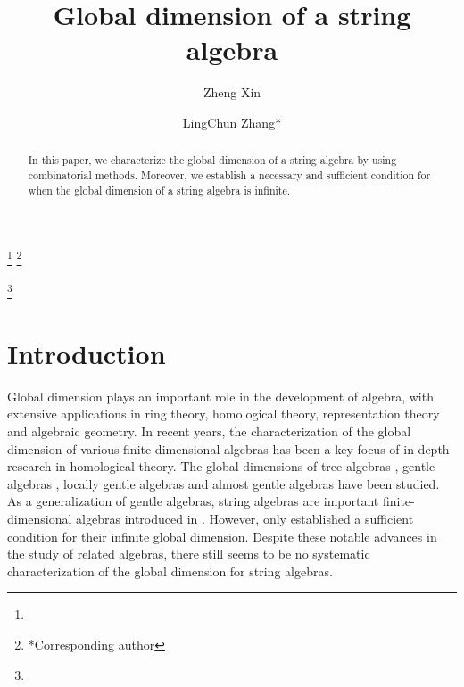 \documentclass[11pt]{amsart}
\numberwithin{equation}{section}
\theoremstyle{definition}
\begin{document}
\title[Global dimension of a string algebra ]{Global dimension of a string algebra }

\author[Zheng Xin]{Zheng Xin}
\address{Zheng Xin,
	School of Mathematics and Statistics, Shaanxi Normal University, Xi'an 710062, China}

\author[LingChun Zhang]{LingChun Zhang*}
\address{LingChun Zhang,
	School of Mathematics and Statistics, Shaanxi Normal University, Xi'an 710062, China}

\thanks{%
	}
\thanks{*Corresponding author}

\keywords{}

\thanks{}

%


\begin{abstract}
In this paper, we characterize the global dimension of a string algebra by using combinatorial methods. 
Moreover, we establish a necessary and sufficient condition for when the global dimension of a string algebra is infinite.
\end{abstract}


\maketitle
\setcounter{tocdepth}{2} %

\tableofcontents

\section*{Introduction}\label{Introductions}



Global dimension plays an important role in the development of algebra, with extensive applications in ring theory, homological theory, representation theory and algebraic geometry. In recent years, the characterization of the global dimension of various finite-dimensional algebras has been a key focus of in-depth research in homological theory. The global dimensions of tree algebras \cite{H14}, gentle algebras \cite{C26,LGH24}, locally gentle algebras \cite{FOZ24} and almost gentle algebras \cite{WHL25} have been studied.
As a generalization of gentle algebras, string algebras are important finite-dimensional algebras introduced in \cite{BR87}. However, \cite{FGR21,FGR22} only established a sufficient condition for their infinite global dimension. 
Despite these notable advances in the study of related algebras, there still seems to be no systematic characterization of the global dimension for string algebras. 
\end{document}
